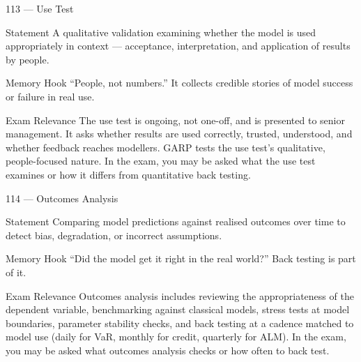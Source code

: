 \documentclass[aspectratio=169,8pt]{beamer}
\begin{document}
	\begin{frame}{113 --- Use Test}
		\begin{block}{Statement}
			A qualitative validation examining whether the model is used appropriately in context --- acceptance, interpretation, and application of results by people.
		\end{block}
		\begin{block}{Memory Hook}
			``People, not numbers.'' It collects credible stories of model success or failure in real use.
		\end{block}
		\begin{block}{Exam Relevance}
			The use test is ongoing, not one-off, and is presented to senior management. It asks whether results are used correctly, trusted, understood, and whether feedback reaches modellers. GARP tests the use test's qualitative, people-focused nature. In the exam, you may be asked what the use test examines or how it differs from quantitative back testing.
		\end{block}
	\end{frame}
	
	\begin{frame}{114 --- Outcomes Analysis}
		\begin{block}{Statement}
			Comparing model predictions against realised outcomes over time to detect bias, degradation, or incorrect assumptions.
		\end{block}
		\begin{block}{Memory Hook}
			``Did the model get it right in the real world?'' Back testing is part of it.
		\end{block}
		\begin{block}{Exam Relevance}
			Outcomes analysis includes reviewing the appropriateness of the dependent variable, benchmarking against classical models, stress tests at model boundaries, parameter stability checks, and back testing at a cadence matched to model use (daily for VaR, monthly for credit, quarterly for ALM). In the exam, you may be asked what outcomes analysis checks or how often to back test.
		\end{block}
	\end{frame}
	
\end{document}
